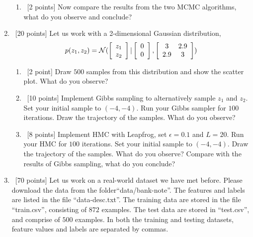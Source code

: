 \documentclass[12pt, fullpage,letterpaper]{article}
\begin{document}
\begin{enumerate}
\begin{enumerate}
		\item~[2 points] Now compare the results from the two MCMC algorithms, what do you observe and conclude?
	\end{enumerate}

	\item~[20 points] Let us work with a 2-dimensional Gaussian distribution, 
	\[
	p(z_1, z_2) = \mathcal{N}(\left[\begin{array}{c}z_1\\z_2
	\end{array}\right] | \left[\begin{array}{c}0\\0
	\end{array}\right], \left[\begin{array}{cc} 3 & 2.9\\2.9 & 3\end{array} \right])
	\]
	\begin{enumerate}
		\item~[2 point] Draw $500$ samples from this distribution and show the scatter plot. What do you observe?
		\item~[10 points] Implement Gibbs sampling to alternatively sample $z_1$ and $z_2$. Set your initial sample to $(-4, -4)$. Run your Gibbs sampler for $100$ iterations. Draw the trajectory of the samples. What do you observe?
		\item~[8 points] Implement HMC with Leapfrog, set $\epsilon = 0.1$ and $L=20$. Run your HMC for $100$ iterations. Set your initial sample to $(-4, -4)$. Draw the trajectory of the samples. What do you observe? Compare with the results of Gibbs sampling, what do you conclude?
	\end{enumerate}

	\item~[70 points] Let us work on a real-world dataset we have met before. Please download the data from the folder``data/bank-note''. The features and labels are listed in the file ``data-desc.txt''. The training data are stored in the file ``train.csv'', consisting of $872$ examples. The test data are stored in ``test.csv'', and comprise of $500$ examples. In both the training and testing datasets, feature values and labels are separated by commas. 
	 

\end{enumerate}
\end{document}
